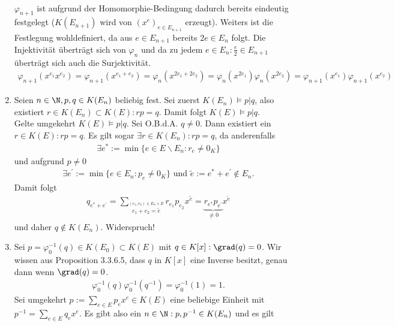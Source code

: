 \begin{solution}
\begin{enumerate}
\begin{align*}
  \end{align*}
  $\varphi_{n+1}$ ist aufgrund der Homomorphie-Bedingung dadurch bereits eindeutig
  festgelegt ($K(E_{n+1})$ wird von $(x^e)_{e \in E_{n+1}}$ erzeugt). Weiters ist die Festlegung wohldefiniert, da aus $e \in E_{n+1}$
bereits $2e \in E_n$ folgt. Die Injektivität überträgt sich von $\varphi_n$ und da zu jedem $e \in E_n: \frac{e}{2} \in E_{n+1}$
überträgt sich auch die Surjektivität.
  \begin{align*}
    \varphi_{n+1}(x^{e_1}x^{e_2}) = \varphi_{n+1}(x^{e_1 + e_2}) = \varphi_n(x^{2e_1 + 2e_2})
    = \varphi_n(x^{2e_1})\varphi_n(x^{2e_2}) = \varphi_{n+1}(x^{e_1})\varphi_{n+1}(x^{e_2})
  \end{align*}
  \item Seien $n \in \N, p,q \in K(E_n)$ beliebig fest.
  Sei zuerst $K(E_n) \vDash p|q$, also existiert $r \in K(E_n) \subset K(E): rp = q$.
  Damit folgt $ K(E) \vDash p|q$. \\
  Gelte umgekehrt $K(E) \vDash p | q$. Sei O.B.d.A. $q \neq 0$.
  Dann existiert ein $r \in K(E): rp = q $.
  Es gilt sogar $\exists r \in K(E_n): rp = q$, da anderenfalls
  \begin{align*}
    \exists e^* := \min \{e \in E\backslash E_n: r_e \neq 0_K\}
  \end{align*}
  und aufgrund $p \neq 0$
  \begin{align*}
    \exists e^{\prime} := \min \{e \in E_n: p_e \neq 0_K\} \text{ und }
    \widetilde{e} := e^* + e^{\prime} \notin E_n.
  \end{align*}
  Damit folgt
  \begin{align*}
    q_{e^* + e^{\prime}} = \sum_{\stackrel{(e_1,e_2) \in E_n \times E}{e_1 + e_2 = \widetilde{e}}}r_{e_1}p_{e_2}x^{\widetilde{e}}
    = \underbrace{r_{e^*}p_{e^{\prime}}}_{\neq 0}x^{\widetilde{e}}
  \end{align*}
  und daher $q \notin K(E_n)$. Widerspruch!
  \item Sei $p = \varphi_0^{-1}(q) \in K(E_0) \subset K(E)$ mit $q \in K[x]: \grad(q) = 0$.
  Wir wissen aus Proposition 3.3.6.5, dass $q$ in $K[x]$ eine Inverse besitzt, genau
  dann wenn $\grad(q) = 0$.
  \begin{align*}
    \varphi_0^{-1}(q)\varphi_0^{-1}(q^{-1}) = \varphi_0^{-1}(1) = 1.
  \end{align*}
  Sei umgekehrt $p := \sum_{e \in E}p_ex^e \in K(E)$ eine beliebige Einheit
  mit $p^{-1} = \sum_{e \in E}q_ex^e$. Es gibt also ein $n \in \N: p,p^{-1} \in K(E_n)$ und es gilt
  \begin{align*}

\end{align*}
\end{enumerate}
\end{solution}
